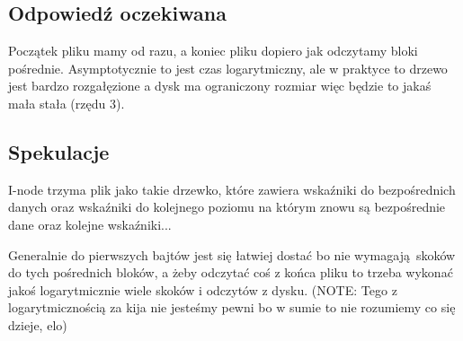 \subsection{Odpowiedź oczekiwana}
Początek pliku mamy od razu, a koniec pliku dopiero jak odczytamy bloki pośrednie.
Asymptotycznie to jest czas logarytmiczny, ale w praktyce to drzewo jest bardzo rozgałęzione a dysk ma ograniczony rozmiar więc będzie to jakaś mała stała (rzędu 3).

\subsection{Spekulacje}
I-node trzyma plik jako takie drzewko, które zawiera wskaźniki do bezpośrednich danych  oraz wskaźniki do kolejnego poziomu na którym znowu są bezpośrednie dane oraz kolejne wskaźniki...

Generalnie do pierwszych bajtów jest się łatwiej dostać bo nie wymagają skoków do tych pośrednich bloków,
a żeby odczytać coś z końca pliku to trzeba wykonać jakoś logarytmicznie wiele skoków i odczytów z dysku. (NOTE: Tego z logarytmicznością za kija nie jesteśmy pewni bo w sumie to nie rozumiemy co się dzieje, elo)